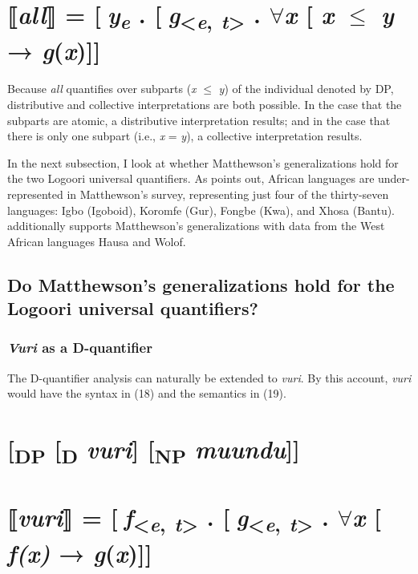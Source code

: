\documentclass[output=paper]{langsci/langscibook}
\begin{document}
\chapter[      ⟦all⟧ = [ye . [g{\textless}e, t{\textgreater} . ${\forall}$x [ x ${\leq}$ y → g(x){]}{]}]{      ⟦\textit{all}⟧ = [\textit{y}\textit{\textsubscript{e}} . [\textit{g}\textsubscript{{\textless}}\textit{\textsubscript{e}}\textsubscript{, }\textit{\textsubscript{t}}\textsubscript{{\textgreater}} . ${\forall}$\textit{x }[ \textit{x} ${\leq}$\textit{ y} → \textit{g}(\textit{x})]]}

Because \textit{all }quantifies over subparts (\textit{x }${\leq}$ \textit{y}) of the individual denoted by DP, distributive and collective interpretations are both possible. In the case that the subparts are atomic, a distributive interpretation results; and in the case that there is only one subpart (i.e., \textit{x} = \textit{y}), a collective interpretation results.

  In the next subsection, I look at whether Matthewson's generalizations hold for the two Logoori universal quantifiers. As \citet{Zimmermann2014} points out, African languages are under-represented in Matthewson's survey, representing just four of the thirty-seven languages: Igbo (Igoboid), Koromfe (Gur), Fongbe (Kwa), and Xhosa (Bantu). \citet{Zimmermann2014} additionally supports Matthewson's generalizations with data from the West African languages Hausa \citep{Zimmermann2013} and Wolof.

\section{Do Matthewson's generalizations hold for the Logoori universal quantifiers?}
\subsection{\textit{Vuri} as a D-quantifier}

The D-quantifier analysis can naturally be extended to \textit{vuri}. By this account, \textit{vuri }would have the syntax in (18) and the semantics in (19).

\chapter[      [DP [D vuri{]} [NP muundu{]}{]}]{      [\textsubscript{DP }[\textsubscript{D} \textit{vuri}] [\textsubscript{NP }\textit{muundu}]]}
\chapter[      ⟦vuri⟧ = [f{\textless}e, t{\textgreater} . [g{\textless}e, t{\textgreater} . ${\forall}$x [ f(x) → g(x){]}{]}]{      ⟦\textit{vuri}⟧ = [\textit{f}\textsubscript{{\textless}}\textit{\textsubscript{e}}\textsubscript{, }\textit{\textsubscript{t}}\textsubscript{{\textgreater}} . [\textit{g}\textsubscript{{\textless}}\textit{\textsubscript{e}}\textsubscript{, }\textit{\textsubscript{t}}\textsubscript{{\textgreater}} . ${\forall}$\textit{x }[ \textit{f(x)} → \textit{g}(\textit{x})]]}
\end{document}
